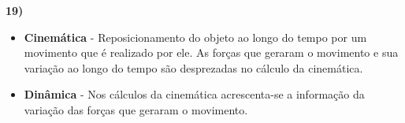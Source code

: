 \textbf{19)} 

\begin{itemize}
    \item \textbf{Cinemática} - Reposicionamento do objeto ao longo do tempo 
    por um movimento que é realizado por ele. As forças que geraram o movimento 
    e sua variação ao longo do tempo são desprezadas no cálculo da cinemática. 

    \item \textbf{Dinâmica} - Nos cálculos da cinemática acrescenta-se a 
    informação da variação das forças que geraram o movimento.
\end{itemize}



